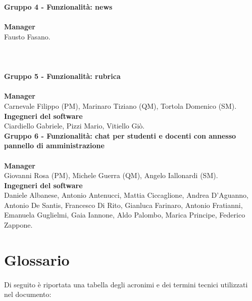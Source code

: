 \textbf {Gruppo 4 - Funzionalità: news} \\ \\
\textbf{Manager} \\
Fausto Fasano. \\ \\ \\ \\

\textbf {Gruppo 5 - Funzionalità: rubrica} \\ \\
\textbf{Manager} \\
Carnevale Filippo (PM), Marinaro Tiziano (QM), Tortola Domenico (SM). \\
\textbf{Ingegneri del software} \\
Ciardiello Gabriele, Pizzi Mario, Vitiello Giò. \\

\textbf{Gruppo 6 - Funzionalità: chat per studenti e docenti con annesso pannello di amministrazione} \\ \\
\textbf{Manager} \\
\textbf{} 
Giovanni Rosa (PM), Michele Guerra (QM), Angelo Iallonardi (SM). \\
\textbf{Ingegneri del software } \\
Daniele Albanese, Antonio Antenucci, Mattia Ciccaglione, Andrea D'Aguanno, Antonio De Santis,  Francesco Di Rito, Gianluca Farinaro, Antonio Fratianni, Emanuela Guglielmi, Gaia Iannone, Aldo Palombo, Marica Principe, Federico Zappone.

\clearpage
\section{Glossario}

\paragraph{}
Di seguito è riportata una tabella degli acronimi e dei termini tecnici utilizzati nel documento:

